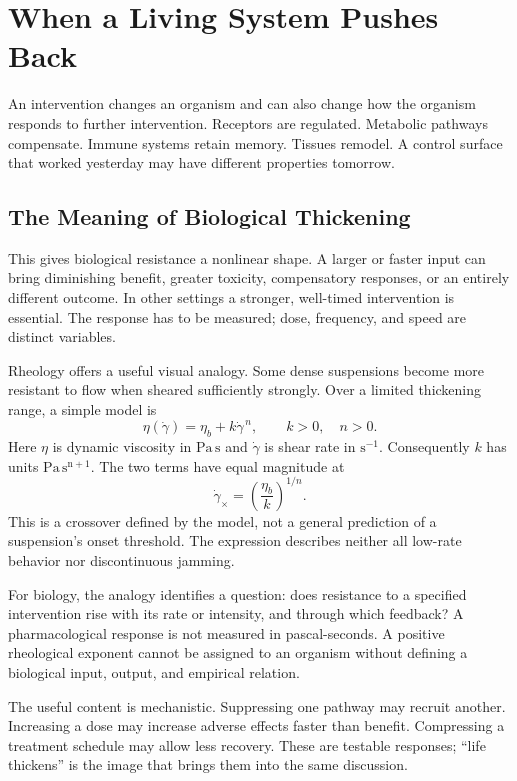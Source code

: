 \section{When a Living System Pushes Back}

An intervention changes an organism and can also change how the organism responds to further intervention. Receptors are regulated. Metabolic pathways compensate. Immune systems retain memory. Tissues remodel. A control surface that worked yesterday may have different properties tomorrow.

\subsection{The Meaning of Biological Thickening}

This gives biological resistance a nonlinear shape. A larger or faster input can bring diminishing benefit, greater toxicity, compensatory responses, or an entirely different outcome. In other settings a stronger, well-timed intervention is essential. The response has to be measured; dose, frequency, and speed are distinct variables.

Rheology offers a useful visual analogy. Some dense suspensions become more resistant to flow when sheared sufficiently strongly. Over a limited thickening range, a simple model is
\begin{equation}
 \eta(\dot\gamma)=\eta_b+k\dot\gamma^{\,n},
 \qquad k>0,\quad n>0.
\end{equation}
Here $\eta$ is dynamic viscosity in $\mathrm{Pa\,s}$ and $\dot\gamma$ is shear rate in $\mathrm{s^{-1}}$. Consequently $k$ has units $\mathrm{Pa\,s^{n+1}}$. The two terms have equal magnitude at
\begin{equation}
 \dot\gamma_\times=\left(\frac{\eta_b}{k}\right)^{1/n}.
\end{equation}
This is a crossover defined by the model, not a general prediction of a suspension's onset threshold. The expression describes neither all low-rate behavior nor discontinuous jamming.

For biology, the analogy identifies a question: does resistance to a specified intervention rise with its rate or intensity, and through which feedback? A pharmacological response is not measured in pascal-seconds. A positive rheological exponent cannot be assigned to an organism without defining a biological input, output, and empirical relation.

The useful content is mechanistic. Suppressing one pathway may recruit another. Increasing a dose may increase adverse effects faster than benefit. Compressing a treatment schedule may allow less recovery. These are testable responses; “life thickens” is the image that brings them into the same discussion.

